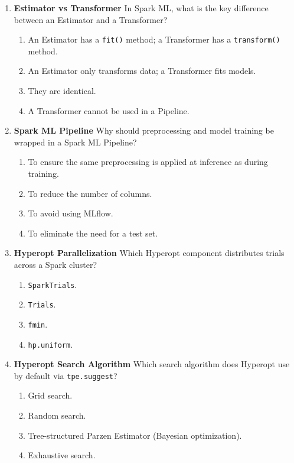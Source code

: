 \documentclass{article}
\begin{document}
\begin{enumerate}[label=\textbf{Q\arabic*.}]
		\item \textbf{Estimator vs Transformer}
		In Spark ML, what is the key difference between an Estimator and a Transformer?
		\begin{enumerate}[label=\Alph*.]
			\item An Estimator has a \texttt{fit()} method; a Transformer has a \texttt{transform()} method.
			\item An Estimator only transforms data; a Transformer fits models.
			\item They are identical.
			\item A Transformer cannot be used in a Pipeline.
		\end{enumerate}
		
		\item \textbf{Spark ML Pipeline}
		Why should preprocessing and model training be wrapped in a Spark ML Pipeline?
		\begin{enumerate}[label=\Alph*.]
			\item To ensure the same preprocessing is applied at inference as during training.
			\item To reduce the number of columns.
			\item To avoid using MLflow.
			\item To eliminate the need for a test set.
		\end{enumerate}
		
		\item \textbf{Hyperopt Parallelization}
		Which Hyperopt component distributes trials across a Spark cluster?
		\begin{enumerate}[label=\Alph*.]
			\item \texttt{SparkTrials}.
			\item \texttt{Trials}.
			\item \texttt{fmin}.
			\item \texttt{hp.uniform}.
		\end{enumerate}
		
		\item \textbf{Hyperopt Search Algorithm}
		Which search algorithm does Hyperopt use by default via \texttt{tpe.suggest}?
		\begin{enumerate}[label=\Alph*.]
			\item Grid search.
			\item Random search.
			\item Tree-structured Parzen Estimator (Bayesian optimization).
			\item Exhaustive search.
		\end{enumerate}
		

\end{enumerate}
\end{document}
